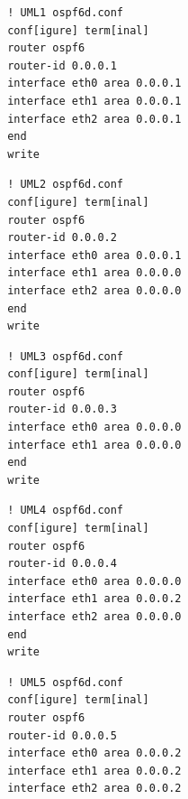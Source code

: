\documentclass{article}
\begin{document}
\begin{verbatim}
 ! UML1 ospf6d.conf
 conf[igure] term[inal]
 router ospf6
 router-id 0.0.0.1
 interface eth0 area 0.0.0.1
 interface eth1 area 0.0.0.1
 interface eth2 area 0.0.0.1
 end
 write
\end{verbatim}

\begin{verbatim}
 ! UML2 ospf6d.conf
 conf[igure] term[inal]
 router ospf6
 router-id 0.0.0.2
 interface eth0 area 0.0.0.1
 interface eth1 area 0.0.0.0
 interface eth2 area 0.0.0.0
 end
 write
\end{verbatim}

\begin{verbatim}
 ! UML3 ospf6d.conf
 conf[igure] term[inal]
 router ospf6
 router-id 0.0.0.3
 interface eth0 area 0.0.0.0
 interface eth1 area 0.0.0.0
 end
 write
\end{verbatim}

\begin{verbatim}
 ! UML4 ospf6d.conf
 conf[igure] term[inal]
 router ospf6
 router-id 0.0.0.4
 interface eth0 area 0.0.0.0
 interface eth1 area 0.0.0.2
 interface eth2 area 0.0.0.0
 end
 write
\end{verbatim}

\begin{verbatim}
 ! UML5 ospf6d.conf
 conf[igure] term[inal]
 router ospf6
 router-id 0.0.0.5
 interface eth0 area 0.0.0.2
 interface eth1 area 0.0.0.2
 interface eth2 area 0.0.0.2
\end{verbatim}
\end{document}
